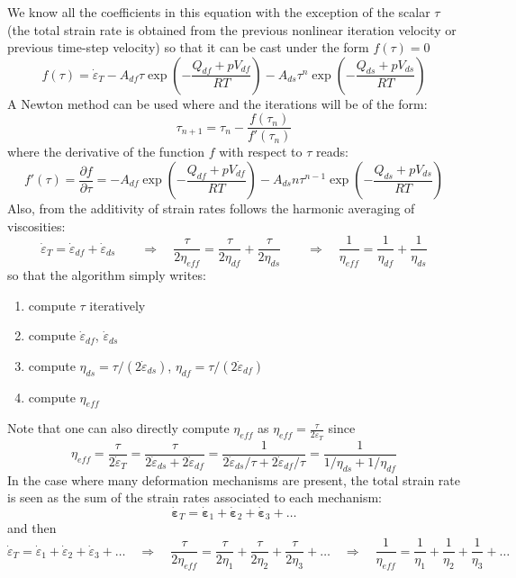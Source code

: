 We know all the coefficients in this equation with the exception of the scalar $\tau$ (the total strain rate
is obtained from the previous nonlinear iteration velocity or previous time-step velocity) so that 
it can be cast under the form $f(\tau)=0$ 
\[
f(\tau)=
\dot{\varepsilon}_{T} - A_{df} \tau \exp\left(-\frac{Q_{df}+pV_{df}}{RT}\right) - A_{ds} \tau^n \exp\left(-\frac{Q_{ds}+pV_{ds}}{RT}\right)
\]
A Newton method can be used where and the iterations will be of the form:
\[
\tau_{n+1} = \tau_n - \frac{f(\tau_n)}{f'(\tau_n)}
\]
where the derivative of the function $f$ with respect to $\tau$ reads:
\[
f'(\tau)=\frac{\partial f}{\partial \tau}=
- A_{df} \exp\left(-\frac{Q_{df}+pV_{df}}{RT}\right) - A_{ds} n \tau^{n-1} \exp\left(-\frac{Q_{ds}+pV_{ds}}{RT}\right)
\]
Also, from the additivity of strain rates follows the harmonic averaging of viscosities:
\[
\dot{\varepsilon}_{T}=\dot{\varepsilon}_{df}+\dot{\varepsilon}_{ds} 
\quad
\quad
\Rightarrow
\quad
\frac{\tau}{2\eta_{eff}}=\frac{\tau}{2\eta_{df}}+\frac{\tau}{2\eta_{ds}}
\quad
\quad
\Rightarrow
\quad
\frac{1}{\eta_{eff}}=\frac{1}{\eta_{df}}+\frac{1}{\eta_{ds}}
\]
so that the algorithm simply writes:
\begin{enumerate}
\item compute $\tau$ iteratively
\item compute $\dot{\varepsilon}_{df}$, $\dot{\varepsilon}_{ds}$
\item compute $\eta_{ds}=\tau/(2\dot{\varepsilon}_{ds})$, $\eta_{df}=\tau/(2\dot{\varepsilon}_{df})$
\item compute $\eta_{eff}$
\end{enumerate}
Note that one can also directly compute $\eta_{eff}$ as $\eta_{eff}=\frac{\tau}{2 \dot{\varepsilon}_T}$
since
\[
\eta_{eff}
=\frac{\tau}{2 \dot{\varepsilon}_T}
=\frac{\tau}{2 \dot{\varepsilon}_{ds}   +  2\dot{\varepsilon}_{df}  }
=\frac{1}{2 \dot{\varepsilon}_{ds}/\tau   +  2\dot{\varepsilon}_{df}/\tau  }
=\frac{1}{1/\eta_{ds} +  1/\eta_{df}  }
\]
In the case where many deformation mechanisms are present, the total strain rate is 
seen as the sum of the strain rates associated to each mechanism:
\[
\dot{\bm \varepsilon}_{T}=\dot{\bm \varepsilon}_{1}+\dot{\bm \varepsilon}_{2} +\dot{\bm \varepsilon}_{3} + \dots
\]
and then
\[
\dot{\varepsilon}_{T}=\dot{\varepsilon}_{1}+\dot{\varepsilon}_{2} +\dot{\varepsilon}_{3} + \dots
\quad
\Rightarrow
\quad
\frac{\tau}{2\eta_{eff}}=\frac{\tau}{2\eta_{1}}+\frac{\tau}{2\eta_{2}}+\frac{\tau}{2\eta_{3}}+ \dots
\quad
\Rightarrow
\quad
\frac{1}{\eta_{eff}}=\frac{1}{\eta_{1}}+\frac{1}{\eta_{2}}+\frac{1}{\eta_{3}}+\dots
\]

